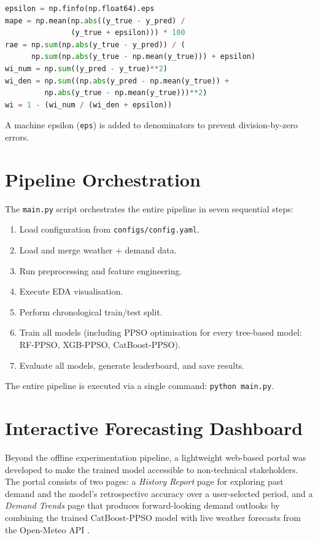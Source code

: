 \begin{lstlisting}[language=Python, caption={Custom metric implementations.}, label={lst:metrics}]
epsilon = np.finfo(np.float64).eps
mape = np.mean(np.abs((y_true - y_pred) /
               (y_true + epsilon))) * 100
rae = np.sum(np.abs(y_true - y_pred)) / (
      np.sum(np.abs(y_true - np.mean(y_true))) + epsilon)
wi_num = np.sum((y_pred - y_true)**2)
wi_den = np.sum((np.abs(y_pred - np.mean(y_true)) +
         np.abs(y_true - np.mean(y_true)))**2)
wi = 1 - (wi_num / (wi_den + epsilon))
\end{lstlisting}

A machine epsilon (\texttt{eps}) is added to denominators to prevent division-by-zero errors.


\section{Pipeline Orchestration}

The \texttt{main.py} script orchestrates the entire pipeline in seven sequential steps:

\begin{enumerate}
    \item Load configuration from \texttt{configs/config.yaml}.
    \item Load and merge weather + demand data.
    \item Run preprocessing and feature engineering.
    \item Execute EDA visualisation.
    \item Perform chronological train/test split.
    \item Train all models (including PPSO optimisation for every tree-based model: RF-PPSO, XGB-PPSO, CatBoost-PPSO).
    \item Evaluate all models, generate leaderboard, and save results.
\end{enumerate}

The entire pipeline is executed via a single command: \texttt{python main.py}.


\section{Interactive Forecasting Dashboard}\label{sec:dashboard}

Beyond the offline experimentation pipeline, a lightweight web-based portal was developed to make the trained model accessible to non-technical stakeholders. The portal consists of two pages: a \emph{History Report} page for exploring past demand and the model's retrospective accuracy over a user-selected period, and a \emph{Demand Trends} page that produces forward-looking demand outlooks by combining the trained CatBoost-PPSO model with live weather forecasts from the Open-Meteo API \parencite{openmeteo2025api}.


